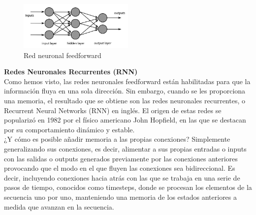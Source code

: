 \begin{figure}[h]
	\centering
	\includegraphics[width = 0.5\textwidth]{Imagenes/Vectorial/feedforward.png}
	\caption{Red neuronal feedforward}
	\label{fig:sampleImage}
\end{figure}



\textbf{Redes Neuronales Recurrentes (RNN)} \\

Como hemos visto, las redes neuronales feedforward están habilitadas para que la información fluya en una sola dirección. Sin embargo, cuando se les proporciona una memoria, el resultado que se obtiene son las redes neuronales recurrentes, o Recurrent Neural Networks (RNN) en inglés. El origen de estas redes se popularizó en 1982 por el físico americano John Hopfield, en las que se destacan por su comportamiento dinámico y estable. \\

¿Y cómo es posible añadir memoria a las propias conexiones? Simplemente generalizando sus conexiones, es decir, alimentar a sus propias entradas o inputs con las salidas o outputs generados previamente por las conexiones anteriores provocando que el modo en el que fluyen las conexiones sea bidireccional. Es decir, incluyendo conexiones hacia atrás con las que se trabaja en una serie de pasos de tiempo, conocidos como timesteps, donde se procesan los elementos de la secuencia uno por uno, manteniendo una memoria de los estados anteriores a medida que avanzan en la secuencia.\\


